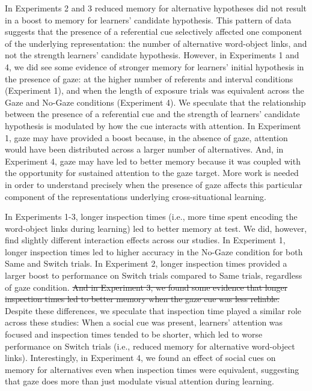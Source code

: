 \documentclass[authoryear, review]{elsarticle}
\providecommand{\DIFdeltex}[1]{{\protect\color{red}\sout{#1}}}                      %
\providecommand{\DIFdelbegin}{} %
\providecommand{\DIFdelend}{} %
\providecommand{\DIFdel}[1]{\texorpdfstring{\DIFdeltex{#1}}{}} %
\begin{document}
In Experiments 2 and 3 reduced memory for alternative hypotheses did not
result in a boost to memory for learners' candidate hypothesis. This
pattern of data suggests that the presence of a referential cue
selectively affected one component of the underlying representation: the
number of alternative word-object links, and not the strength learners'
candidate hypothesis. However, in Experiments 1 and 4, we did see some
evidence of stronger memory for learners' initial hypothesis in the
presence of gaze: at the higher number of referents and interval
conditions (Experiment 1), and when the length of exposure trials was
equivalent across the Gaze and No-Gaze conditions (Experiment 4). We
speculate that the relationship between the presence of a referential
cue and the strength of learners' candidate hypothesis is modulated by
how the cue interacts with attention. In Experiment 1, gaze may have
provided a boost because, in the absence of gaze, attention would have
been distributed across a larger number of alternatives. And, in
Experiment 4, gaze may have led to better memory because it was coupled
with the opportunity for sustained attention to the gaze target. More
work is needed in order to understand precisely when the presence of
gaze affects this particular component of the representations underlying
cross-situational learning.

In Experiments 1-3, longer inspection times (i.e., more time spent
encoding the word-object links during learning) led to better memory at
test. We did, however, find slightly different interaction effects
across our studies. In Experiment 1, longer inspection times led to
higher accuracy in the No-Gaze condition for both Same and Switch
trials. In Experiment 2, longer inspection times provided a larger boost
to performance on Switch trials compared to Same trials, regardless of
gaze condition. \DIFdelbegin \DIFdel{And in Experiment 3, we found some evidence that longer
inspection times led to better memory when the gaze cue was less
reliable. }\DIFdelend Despite these differences, we speculate that inspection
time played a similar role across these studies: When a social cue was
present, learners' attention was focused and inspection times tended to
be shorter, which led to worse performance on Switch trials (i.e.,
reduced memory for alternative word-object links). Interestingly, in
Experiment 4, we found an effect of social cues on memory for
alternatives even when inspection times were equivalent, suggesting that
gaze does more than just modulate visual attention during learning.
\end{document}
